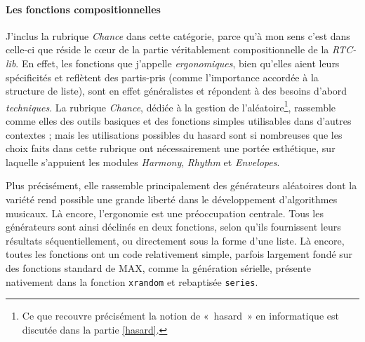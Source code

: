 \documentclass[a4paper,12pt]{article}
\newcommand{\guill}[1]{«~#1~»}
\begin{document}
\paragraph{Les fonctions compositionnelles \\}

J'inclus la rubrique \emph{Chance} dans cette catégorie, parce qu'à mon sens c'est dans celle-ci que réside le cœur de la partie véritablement compositionnelle de la \emph{RTC-lib}. En effet, les fonctions que j'appelle \emph{ergonomiques}, bien qu'elles aient leurs spécificités et reflètent des partis-pris (comme l'importance accordée à la structure de liste), sont en effet généralistes et répondent à des besoins d'abord \emph{techniques}. La rubrique \emph{Chance}, dédiée à la gestion de l'aléatoire\footnote{Ce que recouvre précisément la notion de \guill{hasard} en informatique est discutée dans la partie \ref{hasard}.}, rassemble comme elles des outils basiques et des fonctions simples utilisables dans d'autres contextes ; mais les utilisations possibles du hasard sont si nombreuses que les choix faits dans cette rubrique ont nécessairement une portée esthétique, sur laquelle s'appuient les modules \emph{Harmony}, \emph{Rhythm} et \emph{Envelopes}.

Plus précisément, elle rassemble principalement des générateurs aléatoires dont la variété rend possible une grande liberté dans le développement d'algorithmes musicaux. Là encore, l'ergonomie est une préoccupation centrale. Tous les générateurs sont ainsi déclinés en deux fonctions, selon qu'ils fournissent leurs résultats séquentiellement, ou directement sous la forme d'une liste. Là encore, toutes les fonctions ont un code relativement simple, parfois largement fondé sur des fonctions standard de MAX, comme la génération sérielle, présente nativement dans la fonction \texttt{xrandom} et rebaptisée \texttt{series}.
\end{document}
